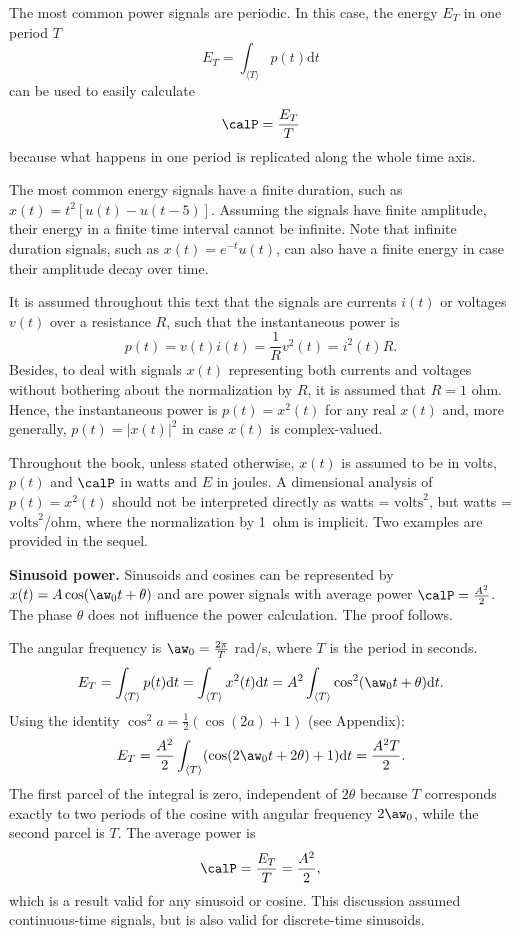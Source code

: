 The most common power signals are periodic. In this case, the energy $E_T$ in one  period $T$
\[
E_T = \int_{\langle T\rangle} {p(t)} \textrm{d}t
\]
can be used to easily calculate 
\[
\calP = \frac{E_T}{T}
\]
because what happens in one period is replicated along the whole time axis.

The most common energy signals have a finite duration, such as $x(t)=t^2[u(t)-u(t-5)]$. Assuming the signals have finite amplitude, their energy in a finite time interval cannot be infinite. Note that infinite duration signals, such as $x(t)=e^{-t}u(t)$, can also have a finite energy in case their amplitude decay over time.

It is assumed throughout this text that the signals are currents $i(t)$ or voltages $v(t)$ over a resistance $R$, such that the instantaneous power is
\[p(t)=v(t)i(t)=\frac{1}{R}v^2(t) = i^2(t) R.\]
Besides, to deal with signals $x(t)$ representing both currents and voltages without bothering about the normalization by $R$, it is assumed that $R=1$ ohm. Hence, the instantaneous power is $p(t)=x^2(t)$ for any real $x(t)$ and, more generally, $p(t)=|x(t)|^2$ in case $x(t)$ is complex-valued.

Throughout the book, unless stated otherwise, $x(t)$ is assumed to be in volts, $p(t)$ and $\calP$ in watts and $E$ in joules. A dimensional analysis of $p(t)=x^2(t)$ should not be interpreted directly as watts = $\textrm{volts}^2$, but watts = $\textrm{volts}^2$/ohm, where the normalization by 1~ohm is implicit. Two examples are provided in the sequel.

\bExample \textbf{Sinusoid power.}
\label{ex:sinusoid_power}
Sinusoids and cosines can be represented by $x(t)=A \cos (\aw_0 t + \theta)$ and are power signals with average power $\calP=\frac{A^2}{2}$. The phase $\theta$ does not influence the power calculation. The proof follows.

The angular frequency is $\aw_0 = \frac{2 \pi}{T}$ rad/s, where $T$ is the period in seconds. 
\[E_T=\int_{\langle T\rangle} p(t)\textrm{d}t= \int_{\langle T\rangle} x^2(t)\textrm{d}t = A^2 \int_{\langle T\rangle}  \cos^2 (\aw_0 t + \theta) \textrm{d}t.\]
Using the identity $\cos^2 a = \frac{1}{2} (\cos (2a) + 1)$ (see Appendix):
\[E_T=\frac{A^2}{2} \int_{\langle T\rangle} (\cos (2\aw_0 t + 2\theta) + 1) \textrm{d}t = \frac{A^2 T}{2}.\]
The first parcel of the integral is zero, independent of $2 \theta$ because $T$ corresponds exactly to two periods of the cosine with angular frequency $2 \aw_0$, while the second parcel is $T$. The average power is
\begin{equation}
\calP = \frac{E_T}{T} = \frac{A^2}{2},
\label{eq:sinusoid_power}
\end{equation}
which is a result valid for any sinusoid or cosine. This discussion assumed continuous-time signals, but  is also valid for discrete-time sinusoids.
\eExample

